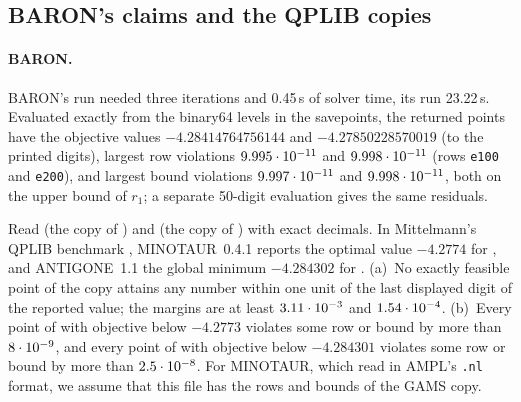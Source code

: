 

\subsection{BARON's claims and the QPLIB copies}\label{app:solvers-baron}

\paragraph{BARON.}
BARON's  run needed three iterations and 0.45\,s of solver time, its  run 23.22\,s.
Evaluated exactly from the binary64 levels in the savepoints, the returned points have the objective values $-4.28414764756144$ and $-4.27850228570019$ (to the printed digits), largest row violations $9.995\cdot 10^{-11}$ and $9.998\cdot 10^{-11}$ (rows \texttt{e100} and \texttt{e200}), and largest bound violations $9.997\cdot 10^{-11}$ and $9.998\cdot 10^{-11}$, both on the upper bound of $r_1$; a separate 50-digit evaluation gives the same residuals.

\begin{certbox}
\end{certbox}

\begin{proposition}\label{prop:qplib-copies}
Read  (the copy of ) and  (the copy of ) with exact decimals.
In Mittelmann's QPLIB benchmark \citep{mittelmann2026-continuous-non-convex-qplib-benchmark}, MINOTAUR~0.4.1 reports the optimal value $-4.2774$ for , and ANTIGONE~1.1 the global minimum $-4.284302$ for .
\textup{(a)}~No exactly feasible point of the copy attains any number within one unit of the last displayed digit of the reported value; the margins are at least $3.11\cdot 10^{-3}$ and $1.54\cdot 10^{-4}$.
\textup{(b)}~Every point of  with objective below $-4.2773$ violates some row or bound by more than $8\cdot 10^{-9}$, and every point of  with objective below $-4.284301$ violates some row or bound by more than $2.5\cdot 10^{-8}$.
For MINOTAUR, which read  in AMPL's \texttt{.nl} format, we assume that this file has the rows and bounds of the GAMS copy.
\end{proposition}

